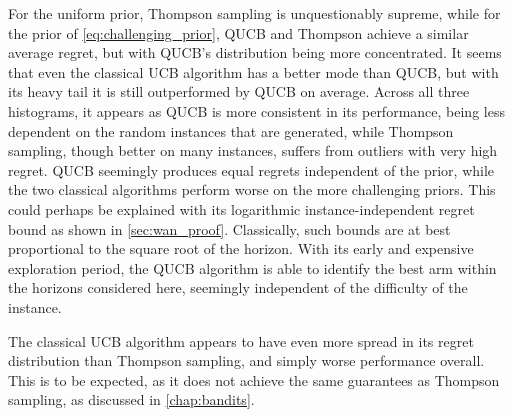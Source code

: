 For the uniform prior, Thompson sampling is unquestionably supreme, while for the prior of \cref{eq:challenging_prior}, QUCB and Thompson achieve a similar average regret, but with QUCB's distribution being more concentrated.
It seems that even the classical UCB algorithm has a better mode than QUCB, but with its heavy tail it is still outperformed by QUCB on average.
Across all three histograms, it appears as QUCB is more consistent in its performance, being less dependent on the random instances that are generated, while Thompson sampling, though better on many instances, suffers from outliers with very high regret.
QUCB seemingly produces equal regrets independent of the prior, while the two classical algorithms perform worse on the more challenging priors.
This could perhaps be explained with its logarithmic instance-independent regret bound as shown in \cref{sec:wan_proof}.
Classically, such bounds are at best proportional to the square root of the horizon.
With its early and expensive exploration period, the QUCB algorithm is able to identify the best arm within the horizons considered here, seemingly independent of the difficulty of the instance.

The classical UCB algorithm appears to have even more spread in its regret distribution than Thompson sampling, and simply worse performance overall.
This is to be expected, as it does not achieve the same guarantees as Thompson sampling, as discussed in \cref{chap:bandits}.




